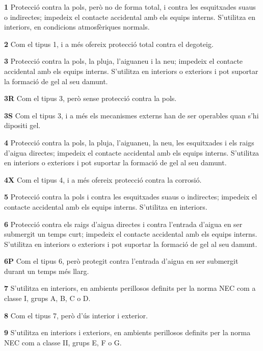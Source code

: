 \begin{list}{}
   {\setlength{\labelwidth}{10mm} \setlength{\leftmargin}{10mm} \setlength{\labelsep}{2mm}}
   \item[\textbf{1}] Protecció contra la pols, però no de forma total, i contra les esquitxades suaus o indirectes; impedeix el contacte accidental amb els equips interns. S'utilitza en interiors, en condicions atmosfèriques normals.
   \item[\textbf{2}] Com el tipus 1, i a més ofereix protecció total contra el degoteig.
   \item[\textbf{3}] Protecció contra la pols, la pluja, l'aiguaneu i la neu; impedeix el contacte accidental amb els equips interns. S'utilitza en interiors o exteriors i pot suportar la formació de gel al seu damunt.
   \item[\textbf{3R}] Com el tipus 3, però sense protecció contra la pols.
   \item[\textbf{3S}] Com el tipus 3, i a més els mecanismes externs han de ser operables quan s'hi dipositi gel.
    \item[\textbf{4}] Protecció contra la pols, la pluja, l'aiguaneu, la neu, les esquitxades i els raigs d'aigua directes; impedeix el contacte accidental amb els equips interns. S'utilitza en interiors o exteriors i pot suportar la formació de gel al seu damunt.
   \item[\textbf{4X}] Com el tipus 4, i a més ofereix protecció contra la corrosió.
   \item[\textbf{5}] Protecció contra la pols i contra les esquitxades suaus o indirectes; impedeix el contacte accidental amb els equips interns. S'utilitza en interiors.
   \item[\textbf{6}] Protecció contra els raigs d'aigua directes i contra l'entrada d'aigua en ser submergit un temps curt; impedeix el contacte accidental amb els equips interns. S'utilitza en interiors o exteriors i pot suportar la formació de gel al seu damunt.
   \item[\textbf{6P}] Com el tipus 6, però protegit contra l'entrada d'aigua en ser submergit durant un temps més llarg.
   \item[\textbf{7}] S'utilitza en interiors, en ambients perillosos definits per la norma NEC com a classe I, grups A, B, C o D.
   \item[\textbf{8}] Com el tipus 7, però d'ús interior i exterior.
   \item[\textbf{9}] S'utilitza en interiors i exteriors, en ambients perillosos definits per la norma NEC com a classe II, grups E, F o G.

\end{list}
